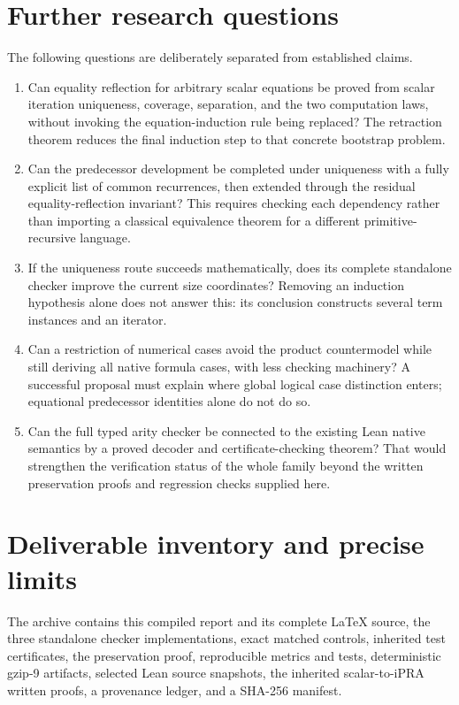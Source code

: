 \documentclass[11pt]{article}
\theoremstyle{definition}\newtheorem{definition}[theorem]{Definition}
\theoremstyle{remark}\newtheorem{remark}[theorem]{Remark}
\begin{document}
\section{Further research questions}

The following questions are deliberately separated from established claims.
\begin{enumerate}
\item Can equality reflection for arbitrary scalar equations be proved
from scalar iteration uniqueness, coverage, separation, and the two
computation laws, without invoking the equation-induction rule being
replaced? The retraction theorem reduces the final induction step to
that concrete bootstrap problem.
\item Can the predecessor development be completed under uniqueness with
a fully explicit list of common recurrences, then extended through the
residual equality-reflection invariant? This requires checking each
dependency rather than importing a classical equivalence theorem for a
different primitive-recursive language.
\item If the uniqueness route succeeds mathematically, does its complete
standalone checker improve the current size coordinates? Removing an
induction hypothesis alone does not answer this: its conclusion constructs
several term instances and an iterator.
\item Can a restriction of numerical cases avoid the product countermodel
while still deriving all native formula cases, with less checking
machinery? A successful proposal must explain where global logical case
distinction enters; equational predecessor identities alone do not do so.
\item Can the full typed arity checker be connected to the existing Lean
native semantics by a proved decoder and certificate-checking theorem?
That would strengthen the verification status of the whole family beyond
the written preservation proofs and regression checks supplied here.
\end{enumerate}

\section{Deliverable inventory and precise limits}

The archive contains this compiled report and its complete LaTeX source,
the three standalone checker implementations, exact matched controls,
inherited test certificates, the preservation proof, reproducible metrics
and tests, deterministic gzip-9 artifacts, selected Lean source snapshots,
the inherited scalar-to-iPRA written proofs, a provenance ledger, and a
SHA-256 manifest.
\end{document}
